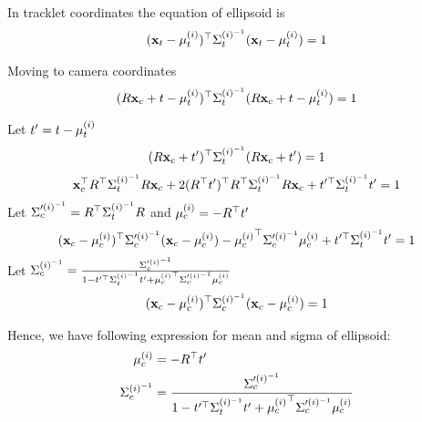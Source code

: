 In tracklet coordinates the equation of ellipsoid is 
\begin{align}
  (\mathbf{x}_t - \mu^{(i)}_t)^\top \Sigma^{(i)^{-1}}_t (\mathbf{x}_t - \mu^{(i)}_t) = 1
\end{align}


Moving to camera coordinates
\begin{align}
  (R \mathbf{x}_c + t - \mu^{(i)}_t)^\top \Sigma^{(i)^{-1}}_t (R \mathbf{x}_c + t - \mu^{(i)}_t) = 1
\end{align}

Let $t' = t - \mu^{(i)}_t$
\begin{align}
  (R \mathbf{x}_c + t')^\top \Sigma^{(i)^{-1}}_t (R \mathbf{x}_c + t') = 1
\end{align}
\begin{align}
  \mathbf{x}_c^\top R^\top \Sigma^{(i)^{-1}}_t R \mathbf{x}_c + 2 (R^\top t')^\top  R^\top\Sigma^{(i)^{-1}}_t R \mathbf{x}_c
  + t'^\top \Sigma^{(i)^{-1}}_t t' = 1
\end{align}
Let $\Sigma'^{(i)^{-1}}_c = R^\top \Sigma^{(i)^{-1}}_t R$ and ${\mu^{(i)}_c} = - R^\top
t'$
\begin{align}
  (\mathbf{x}_c - {\mu^{(i)}_c})^\top\Sigma'^{(i)^{-1}}_c(\mathbf{x}_c - {\mu^{(i)}_c}) - {\mu^{(i)}_c}^\top\Sigma'^{(i)^{-1}}_c{\mu^{(i)}_c} +
  t'^\top \Sigma^{(i)^{-1}}_t t' = 1
\end{align}
Let $\Sigma^{(i)^{-1}}_c = \frac{\Sigma'^{(i)^{-1}}_c}{1 - t'^\top \Sigma^{(i)^{-1}}_t t' +
{\mu^{(i)}_c}^\top\Sigma'^{(i)^{-1}}_c{\mu^{(i)}_c}}$
\begin{align}
(\mathbf{x}_c - {\mu^{(i)}_c})^\top\Sigma^{(i)^{-1}}_c(\mathbf{x}_c - {\mu^{(i)}_c}) = 1
\end{align}

Hence, we have following expression for mean and sigma of ellipsoid:
\begin{align}
  \label{eq:ellipsoidMeanSigma}
  {\mu^{(i)}_c} &= - R^\top t' \\
  \Sigma^{(i)^{-1}}_c &= \frac{\Sigma'^{(i)^{-1}}_c}
{1 - t'^\top \Sigma^{(i)^{-1}}_t t' + {\mu^{(i)}_c}^\top\Sigma'^{(i)^{-1}}_c{\mu^{(i)}_c}}
\end{align}



